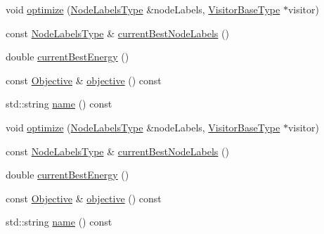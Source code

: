 \begin{DoxyCompactItemize}
\item 
void \hyperlink{classnifty_1_1graph_1_1optimization_1_1multicut_1_1PyMulticutBase_a342edbbfcdb37d0d2df7dc5e8e6799ad}{optimize} (\hyperlink{classnifty_1_1graph_1_1optimization_1_1multicut_1_1PyMulticutBase_a3fa8b01c434939d8187dc7b1515f4d81}{Node\+Labels\+Type} \&node\+Labels, \hyperlink{classnifty_1_1graph_1_1optimization_1_1multicut_1_1PyMulticutBase_a284145d7e67237c95dde085070a89818}{Visitor\+Base\+Type} $\ast$visitor)
\item 
const \hyperlink{classnifty_1_1graph_1_1optimization_1_1multicut_1_1PyMulticutBase_a3fa8b01c434939d8187dc7b1515f4d81}{Node\+Labels\+Type} \& \hyperlink{classnifty_1_1graph_1_1optimization_1_1multicut_1_1PyMulticutBase_a49fc6ba7b5b8d907ca2d0108d4b682e0}{current\+Best\+Node\+Labels} ()
\item 
double \hyperlink{classnifty_1_1graph_1_1optimization_1_1multicut_1_1PyMulticutBase_a92481d042e42104f42d8fc453b5eb03d}{current\+Best\+Energy} ()
\item 
const \hyperlink{classnifty_1_1graph_1_1optimization_1_1multicut_1_1PyMulticutBase_a5cfc50491fd6d59375e8109cf77d832a}{Objective} \& \hyperlink{classnifty_1_1graph_1_1optimization_1_1multicut_1_1PyMulticutBase_afc5494da2138a47506ebddb6e17c9a91}{objective} () const 
\item 
std\+::string \hyperlink{classnifty_1_1graph_1_1optimization_1_1multicut_1_1PyMulticutBase_ab84606e4d7799ee1b0dc3deacf4b72e6}{name} () const 
\item 
void \hyperlink{classnifty_1_1graph_1_1optimization_1_1multicut_1_1PyMulticutBase_a342edbbfcdb37d0d2df7dc5e8e6799ad}{optimize} (\hyperlink{classnifty_1_1graph_1_1optimization_1_1multicut_1_1PyMulticutBase_a3fa8b01c434939d8187dc7b1515f4d81}{Node\+Labels\+Type} \&node\+Labels, \hyperlink{classnifty_1_1graph_1_1optimization_1_1multicut_1_1PyMulticutBase_a284145d7e67237c95dde085070a89818}{Visitor\+Base\+Type} $\ast$visitor)
\item 
const \hyperlink{classnifty_1_1graph_1_1optimization_1_1multicut_1_1PyMulticutBase_a3fa8b01c434939d8187dc7b1515f4d81}{Node\+Labels\+Type} \& \hyperlink{classnifty_1_1graph_1_1optimization_1_1multicut_1_1PyMulticutBase_a49fc6ba7b5b8d907ca2d0108d4b682e0}{current\+Best\+Node\+Labels} ()
\item 
double \hyperlink{classnifty_1_1graph_1_1optimization_1_1multicut_1_1PyMulticutBase_a92481d042e42104f42d8fc453b5eb03d}{current\+Best\+Energy} ()
\item 
const \hyperlink{classnifty_1_1graph_1_1optimization_1_1multicut_1_1PyMulticutBase_a5cfc50491fd6d59375e8109cf77d832a}{Objective} \& \hyperlink{classnifty_1_1graph_1_1optimization_1_1multicut_1_1PyMulticutBase_afc5494da2138a47506ebddb6e17c9a91}{objective} () const 
\item 
std\+::string \hyperlink{classnifty_1_1graph_1_1optimization_1_1multicut_1_1PyMulticutBase_ab84606e4d7799ee1b0dc3deacf4b72e6}{name} () const 
\end{DoxyCompactItemize}


